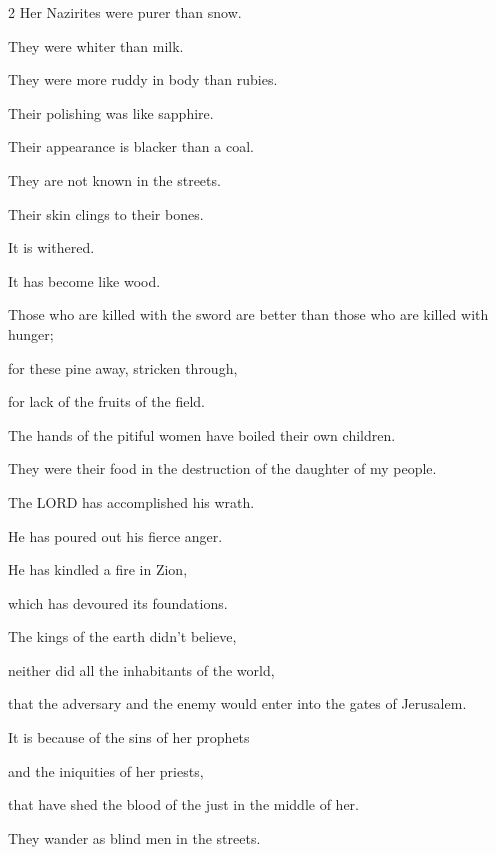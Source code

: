 \begin{multicols}{2}
	\myverse{}Her Nazirites were purer than snow.
	
	They were whiter than milk.
	
	They were more ruddy in body than rubies.
	
	Their polishing was like sapphire.
	\vspace{\baselineskip}
	
	\myverse{}Their appearance is blacker than a coal.
	
	They are not known in the streets.
	
	Their skin clings to their bones.
	
	It is withered.
	
	It has become like wood.
	\vspace{\baselineskip}
	
	\myverse{}Those who are killed with the sword are better than those who
	are killed with hunger;
	
	for these pine away, stricken through,
	
	for lack of the fruits of the field.
	\vspace{\baselineskip}
	
	\myverse{}The hands of the pitiful women have boiled their own children.
	
	They were their food in the destruction of the daughter of my people.
	\vspace{\baselineskip}
	
	\myverse{}The LORD has accomplished his wrath.
	
	He has poured out his fierce anger.
	
	He has kindled a fire in Zion,
	
	which has devoured its foundations.
	\vspace{\baselineskip}
	
	\myverse{}The kings of the earth didn’t believe,
	
	neither did all the inhabitants of the world,
	
	that the adversary and the enemy would enter into the gates of Jerusalem.
	\vspace{\baselineskip}
	
	\myverse{}It is because of the sins of her prophets
	
	and the iniquities of her priests,
	
	that have shed the blood of the just in the middle of her.
	\vspace{\baselineskip}
	
	\myverse{}They wander as blind men in the streets.
	

\end{multicols}
